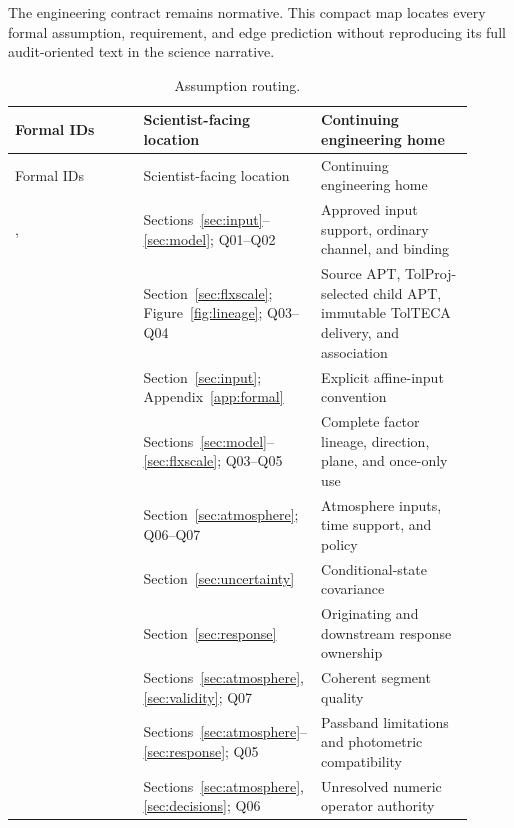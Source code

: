 \small
The engineering contract remains normative. This compact map locates every
formal assumption, requirement, and edge prediction without reproducing its
full audit-oriented text in the science narrative.

\begin{longtable}{L{0.30\linewidth}L{0.26\linewidth}L{0.35\linewidth}}
\caption{Assumption routing.}\\
\toprule Formal IDs & Scientist-facing location & Continuing engineering home \\
\midrule\endfirsthead\toprule Formal IDs & Scientist-facing location & Continuing engineering home \\
\midrule\endhead
{},  & Sections~\ref{sec:input}--\ref{sec:model}; Q01--Q02 & Approved input support, ordinary channel, and binding \\
 & Section~\ref{sec:flxscale}; Figure~\ref{fig:lineage}; Q03--Q04 & Source APT, TolProj-selected child APT, immutable TolTECA delivery, and association \\
 & Section~\ref{sec:input}; Appendix~\ref{app:formal} & Explicit affine-input convention \\
 & Sections~\ref{sec:model}--\ref{sec:flxscale}; Q03--Q05 & Complete factor lineage, direction, plane, and once-only use \\
 & Section~\ref{sec:atmosphere}; Q06--Q07 & Atmosphere inputs, time support, and policy \\
 & Section~\ref{sec:uncertainty} & Conditional-state covariance \\
 & Section~\ref{sec:response} & Originating and downstream response ownership \\
 & Sections~\ref{sec:atmosphere}, \ref{sec:validity}; Q07 & Coherent segment quality \\
 & Sections~\ref{sec:atmosphere}--\ref{sec:response}; Q05 & Passband limitations and photometric compatibility \\
 & Sections~\ref{sec:atmosphere}, \ref{sec:decisions}; Q06 & Unresolved numeric operator authority \\
\bottomrule
\end{longtable}

